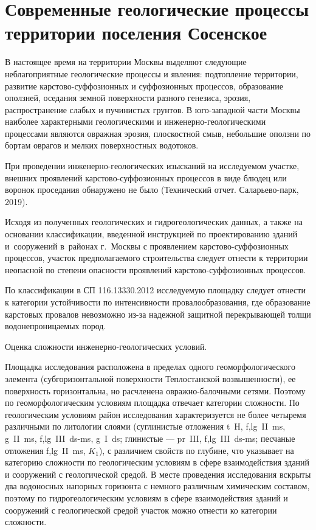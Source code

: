\chapter{Современные геологические процессы территории поселения Сосенское}\label{ch:ch5}

В настоящее время на территории Москвы выделяют следующие неблагоприятные геологические процессы и явления: 
подтопление территории, развитие карстово-суффозионных и суффозионных процессов, образование оползней, 
оседания земной поверхности разного генезиса, эрозия, распространение слабых и пучинистых грунтов. 
В юго-западной части Москвы наиболее характерными геологическими и инженерно-геологическими процессами 
являются овражная эрозия, плоскостной смыв, небольшие оползни по бортам оврагов и мелких поверхностных водотоков.

При проведении инженерно-геологических изысканий на исследуемом участке, внешних проявлений карстово-суффозионных 
процессов в виде блюдец или воронок проседания обнаружено 
не было (Технический отчет. Саларьево-парк, 2019).

Исходя из полученных геологических и гидрогеологических данных, а также на основании классификации, 
введенной инструкцией по проектированию зданий и~сооружений в~районах г.~Москвы с проявлением 
карстово-суффозионных процессов, участок предполагаемого строительства следует отнести к территории 
неопасной по степени опасности проявлений карстово-суффозионных процессов.

По классификации в СП 116.13330.2012 исследуемую площадку следует отнести
 к  категории устойчивости 
по интенсивности провалообразования, где образование карстовых провалов невозможно 
из-за надежной защитной перекрывающей толщи водонепроницаемых пород.

Оценка сложности инженерно-геологических условий. 

Площадка исследования расположена в пределах одного 
геоморфологического элемента (субгоризонтальной поверхности 
Теплостанской возвышенности), ее поверхность 
горизонтальна, но расчленена овражно-балочными сетями. 
Поэтому по геоморфологическим условиям площадка отвечает 
 категории сложности. 
По геологическим условиям район исследования характеризуется 
не более четыремя различными по литологии слоями (суглинистые отложения t~H, f,lg~II~ms, g~II~ms, f,lg~III~ds-ms, g~I~ds;
глинистые --- pr~III, f,lg~III~ds-ms; песчаные отложения f,lg~II~ms, $K_1$), 
с различием свойств по глубине, что указывает на  
категорию сложности по геологическим условиям в сфере взаимодействия 
зданий и сооружений с геологической средой. 
В месте проведения исследования вскрыты два водоносных напорных горизонта с немного 
различным химическим составом, поэтому по гидрогеологическим 
условиям  в сфере взаимодействия зданий и сооружений с геологической 
средой участок можно отнести ко  категории сложности. 

